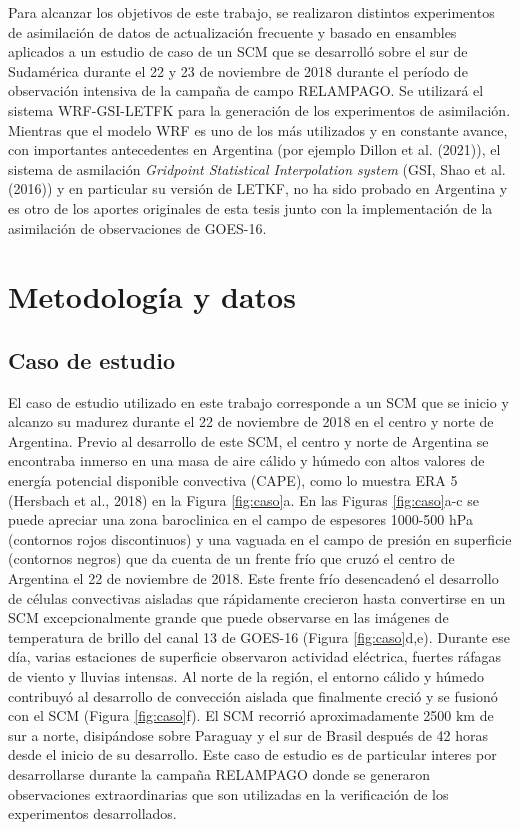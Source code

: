\documentclass[12pt,oneside,a4paper]{reedthesis}
\begin{document}
Para alcanzar los objetivos de este trabajo, se realizaron distintos experimentos de asimilación de datos de actualización frecuente y basado en ensambles aplicados a un estudio de caso de un SCM que se desarrolló sobre el sur de Sudamérica durante el 22 y 23 de noviembre de 2018 durante el período de observación intensiva de la campaña de campo RELAMPAGO. Se utilizará el sistema WRF-GSI-LETFK para la generación de los experimentos de asimilación. Mientras que el modelo WRF es uno de los más utilizados y en constante avance, con importantes antecedentes en Argentina (por ejemplo Dillon et al. (2021)), el sistema de asmilación \emph{Gridpoint Statistical Interpolation system} (GSI, Shao et al. (2016)) y en particular su versión de LETKF, no ha sido probado en Argentina y es otro de los aportes originales de esta tesis junto con la implementación de la asimilación de observaciones de GOES-16.

\hypertarget{metodologuxeda-y-datos}{%
\chapter{Metodología y datos}\label{metodologuxeda-y-datos}}

\hypertarget{caso-de-estudio}{%
\section{Caso de estudio}\label{caso-de-estudio}}

El caso de estudio utilizado en este trabajo corresponde a un SCM que se inicio y alcanzo su madurez durante el 22 de noviembre de 2018 en el centro y norte de Argentina. Previo al desarrollo de este SCM, el centro y norte de Argentina se encontraba inmerso en una masa de aire cálido y húmedo con altos valores de energía potencial disponible convectiva (CAPE), como lo muestra ERA 5 (Hersbach et al., 2018) en la Figura \ref{fig:caso}a. En las Figuras \ref{fig:caso}a-c se puede apreciar una zona baroclinica en el campo de espesores 1000-500 hPa (contornos rojos discontinuos) y una vaguada en el campo de presión en superficie (contornos negros) que da cuenta de un frente frío que cruzó el centro de Argentina el 22 de noviembre de 2018. Este frente frío desencadenó el desarrollo de células convectivas aisladas que rápidamente crecieron hasta convertirse en un SCM excepcionalmente grande que puede observarse en las imágenes de temperatura de brillo del canal 13 de GOES-16 (Figura \ref{fig:caso}d,e). Durante ese día, varias estaciones de superficie observaron actividad eléctrica, fuertes ráfagas de viento y lluvias intensas. Al norte de la región, el entorno cálido y húmedo contribuyó al desarrollo de convección aislada que finalmente creció y se fusionó con el SCM (Figura \ref{fig:caso}f). El SCM recorrió aproximadamente 2500 km de sur a norte, disipándose sobre Paraguay y el sur de Brasil después de 42 horas desde el inicio de su desarrollo. Este caso de estudio es de particular interes por desarrollarse durante la campaña RELAMPAGO donde se generaron observaciones extraordinarias que son utilizadas en la verificación de los experimentos desarrollados.
\end{document}
